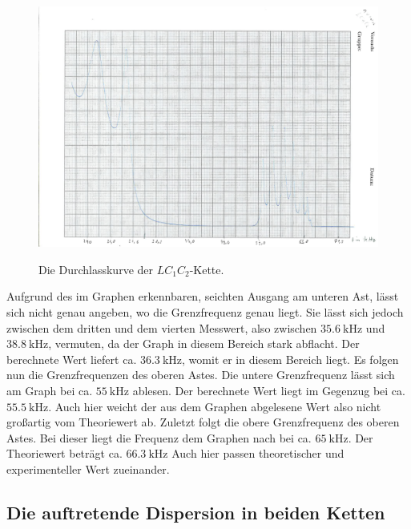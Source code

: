         \begin{figure}[H]
         \centering
         \caption{Die Durchlasskurve der $LC_1C_2$-Kette.}
         \includegraphics[width=\linewidth-70pt,height=\textheight-70pt,keepaspectratio]{content/Scans/LC1C2.png}
         \label{fig:Lc1c2}
        \end{figure}

         Aufgrund des im Graphen erkennbaren, seichten
				Ausgang am unteren Ast, lässt sich nicht genau angeben, wo die
				 Grenzfrequenz genau liegt. Sie lässt sich jedoch zwischen dem dritten
				  und dem vierten Messwert, also zwischen $\SI{35,6}{\kilo\hertz}$ und
					$\SI{38,8}{\kilo\hertz}$, vermuten, da der Graph in diesem Bereich
					 stark abflacht. Der berechnete Wert liefert ca. $\SI{36,3}{\kilo\hertz}$,
					  womit er in diesem Bereich liegt.
						 Es folgen nun die Grenzfrequenzen des oberen Astes. Die
						  untere Grenzfrequenz lässt sich am Graph bei ca. $\SI{55}{\kilo\hertz}$
							ablesen. Der berechnete Wert liegt im Gegenzug bei
							 ca. $\SI{55,5}{\kilo\hertz}$. Auch hier weicht der aus dem Graphen abgelesene Wert also nicht
							 großartig vom Theoriewert ab. Zuletzt folgt die obere Grenzfrequenz
							 des oberen Astes. Bei dieser liegt die Frequenz dem Graphen nach bei ca.
							  $\SI{65}{\kilo\hertz}$. Der Theoriewert beträgt ca. $\SI{66,3}{\kilo\hertz}$
								Auch hier passen theoretischer und experimenteller Wert zueinander.


\subsection{Die auftretende Dispersion in beiden Ketten}
